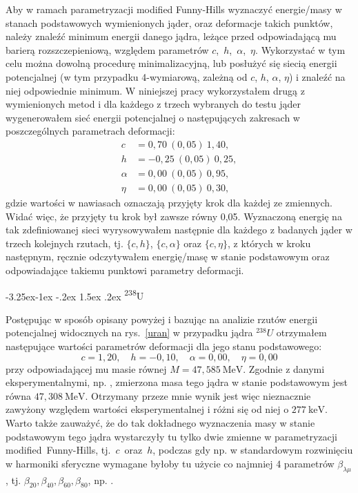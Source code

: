 \documentclass[a4paper,polish]{article}
\makeatletter
\renewcommand\subsubsection{\@startsection{subsubsection}{3}{\z@}%
	{-3.25ex\@plus -1ex \@minus -.2ex}%
	{1.5ex \@plus .2ex}%
	{\normalfont\normalsize\bfseries\boldmath}}
\numberwithin{equation}{section}
\makeatother
\begin{document}
Aby w ramach parametryzacji modified Funny-Hills wyznaczyć energie/masy w stanach podstawowych wymienionych jąder, oraz deformacje takich punktów, należy znaleźć minimum energii danego jądra, leżące przed odpowiadającą mu barierą rozszczepieniową, względem parametrów $c$,~$h$,~$\alpha$,~$\eta$. Wykorzystać w tym celu można dowolną procedurę minimalizacyjną, lub posłużyć się siecią energii potencjalnej (w tym przypadku 4-wymiarową, zależną od $c$, $h$, $\alpha$, $\eta$) i znaleźć na niej odpowiednie minimum. W niniejszej pracy wykorzystałem drugą z wymienionych metod i dla każdego z trzech wybranych do testu jąder wygenerowałem sieć energii potencjalnej o następujących zakresach w poszczególnych parametrach deformacji:
\begin{align*}
c&=0,70~(0,05)~1,40,\\
h&=-0,25~(0,05)~0,25,\\
\alpha&=0,00~(0,05)~0,95,\\
\eta&=0,00~(0,05)~0,30,
\end{align*}
gdzie wartości w nawiasach oznaczają przyjęty krok dla każdej ze zmiennych. Widać więc, że przyjęty tu krok był zawsze równy 0,05. Wyznaczoną energię na tak zdefiniowanej sieci wyrysowywałem następnie dla każdego z badanych jąder w trzech kolejnych rzutach, tj. $\{c,h\}$, $\{c, \alpha\}$ oraz $\{c, \eta\}$, z których w kroku następnym, ręcznie odczytywałem energię/masę w stanie podstawowym oraz odpowiadające takiemu punktowi parametry deformacji.

\clearpage
\subsubsection{\textsuperscript{238}U}

Postępując w sposób opisany powyżej i bazując na analizie rzutów energii potencjalnej widocznych na rys.~\ref{uran} w przypadku jądra $^{238}U$ otrzymałem następujące wartości parametrów deformacji dla jego stanu podstawowego:
\begin{equation*}
c=1,20, \quad h=-0,10, \quad \alpha=0,00, \quad \eta= 0,00
\end{equation*}
przy odpowiadającej mu masie równej $M=47,585~\mathrm{MeV}$. Zgodnie z danymi eksperymentalnymi, np. \cite{brookhaven}, zmierzona masa tego jądra w stanie podstawowym jest równa $47,308~\mathrm{MeV}$. Otrzymany przeze mnie wynik jest więc nieznacznie zawyżony względem wartości eksperymentalnej i różni się od niej o $277~\mathrm{keV}$. Warto także zauważyć, że do tak dokładnego wyznaczenia masy w stanie podstawowym tego jądra wystarczyły tu tylko dwie zmienne w parametryzacji \mbox{modified Funny-Hills}, \mbox{tj. $c$ oraz $h$}, podczas gdy np. w standardowym rozwinięciu w harmoniki sferyczne wymagane byłoby tu użycie co najmniej 4 parametrów $\beta_{\lambda \mu}$, tj. $\beta_{20},\beta_{40},\beta_{60},\beta_{80}$, np. \cite{JACHBF}.
\end{document}
